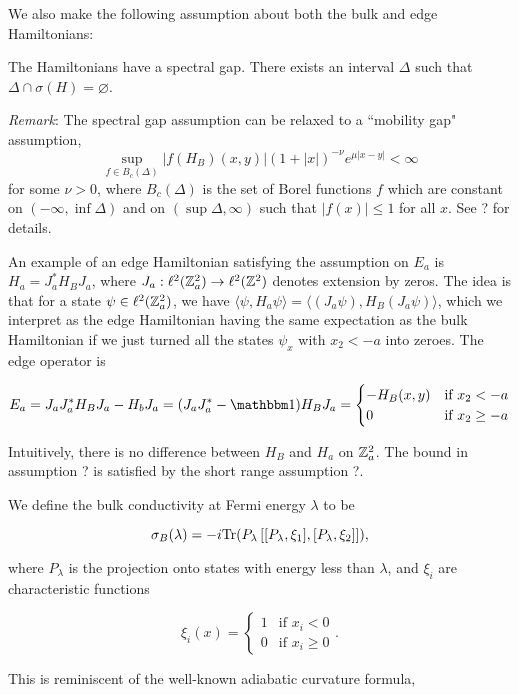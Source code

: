 \documentclass[12pt, letterpaper]{article}
\begin{document}
We also make the following assumption about both the bulk and edge Hamiltonians:

\begin{assumption}
The Hamiltonians have a spectral gap. There exists an interval $\Delta$ such that $\Delta \cap \sigma(H) = \varnothing$.
\end{assumption}

\textit{Remark}: The spectral gap assumption can be relaxed to a ``mobility gap" assumption,
\[\sup_{f \in B_c(\Delta)}|f(H_B)(x,y)|(1+|x|)^{-\nu}e^{\mu|x-y|} < \infty\]
for some $\nu>0$, where $B_c(\Delta)$ is the set of Borel functions $f$ which are constant on $(-\infty,\inf \Delta)$ and on $(\sup \Delta, \infty)$ such that $|f(x)| \leq 1$ for all $x$. See ? for details.

An example of an edge Hamiltonian satisfying the assumption on $E_a$ is $H_a = J_a^*H_BJ_a$, where $J_a:\ell^2(\mathbb{Z}^2_a)\to\ell^2(\mathbb{Z}^2)$ denotes extension by zeros. The idea is that for a state $\psi \in \ell^2(\mathbb{Z}^2_a)$, we have $\langle \psi, H_a \psi \rangle = \langle (J_a \psi), H_B (J_a\psi) \rangle$, which we interpret as the edge Hamiltonian having the same expectation as the bulk Hamiltonian if we just turned all the states $\psi_x$ with $x_2<-a$ into zeroes.  The edge operator is 

\[E_a = J_aJ_a^*H_BJ_a - H_bJ_a = (J_aJ_a^*-\One)H_BJ_a = \begin{cases} -H_B(x,y) & \text{if } x_2 < -a \\ 0 & \text{if } x_2\geq -a\end{cases}\]

Intuitively, there is no difference between $H_B$ and $H_a$ on $\mathbb{Z}^2_a$. The bound in assumption ? is satisfied by the short range assumption ?.

We define the bulk conductivity at Fermi energy $\lambda$ to be

\[\sigma_B(\lambda) = -i\text{Tr}(P_\lambda \left[[P_\lambda,\xi_1],[P_\lambda,\xi_2]\right]),\]

where $P_\lambda$ is the projection onto states with energy less than $\lambda$, and $\xi_i$ are characteristic functions

\[\xi_i(x) = \begin{cases} 1 & \text{if } x_i<0 \\ 0 & \text{if } x_i \geq 0\end{cases}.\]

This is reminiscent of the well-known adiabatic curvature formula,
\end{document}
